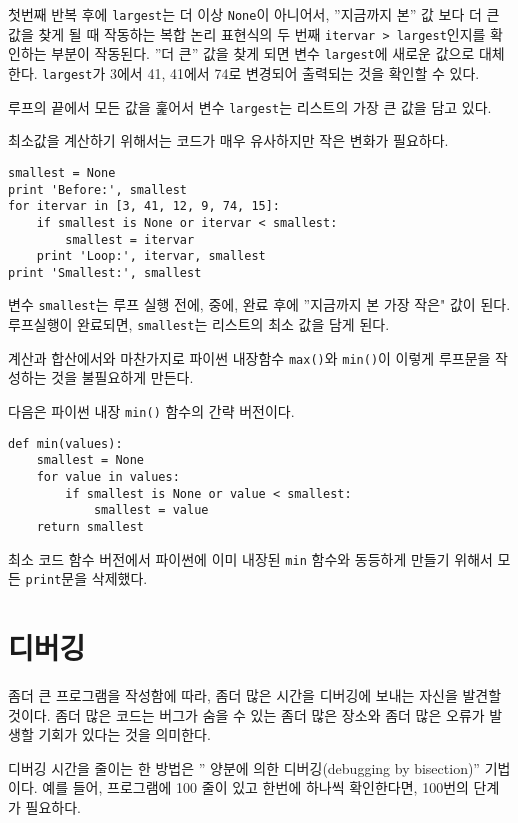 첫번째 반복 후에 {\tt largest}는 더 이상 {\tt None}이 아니어서, ''지금까지 본'' 값 보다 더 큰 값을 찾게 될 때 작동하는  복합 논리 표현식의 두 번째 {\tt itervar > largest}인지를 확인하는 부분이 작동된다. ''더 큰'' 값을 찾게 되면 변수 {\tt largest}에 새로운 값으로 대체한다.
{\tt largest}가 3에서 41, 41에서 74로 변경되어 출력되는 것을 확인할 수 있다.

루프의 끝에서 모든 값을 훑어서 변수 {\tt largest}는 리스트의 가장 큰 값을 담고 있다.

최소값을 계산하기 위해서는 코드가 매우 유사하지만 작은 변화가 필요하다.

\beforeverb
\begin{verbatim}
smallest = None
print 'Before:', smallest
for itervar in [3, 41, 12, 9, 74, 15]:
    if smallest is None or itervar < smallest:
        smallest = itervar
    print 'Loop:', itervar, smallest
print 'Smallest:', smallest
\end{verbatim}
\afterverb
%

변수 {\tt smallest}는 루프 실행 전에, 중에, 완료 후에 ''지금까지 본 가장 작은" 값이 된다.
루프실행이 완료되면, {\tt smallest}는 리스트의 최소 값을 담게 된다.

계산과 합산에서와 마찬가지로 파이썬 내장함수 {\tt max()}와 {\tt min()}이 이렇게 루프문을 작성하는 것을 불필요하게 만든다.

다음은 파이썬 내장 {\tt min()} 함수의 간략 버전이다.

\beforeverb
\begin{verbatim}
def min(values):
    smallest = None
    for value in values:
        if smallest is None or value < smallest:
            smallest = value
    return smallest
\end{verbatim}
\afterverb
%

최소 코드 함수 버전에서 파이썬에 이미 내장된 {\tt min} 함수와 동등하게 만들기 위해서 모든 {\tt print}문을 삭제했다.

\section{디버깅}

좀더 큰 프로그램을 작성함에 따라, 좀더 많은 시간을 디버깅에 보내는 자신을 발견할 것이다.
좀더 많은 코드는 버그가 숨을 수 있는 좀더 많은 장소와 좀더 많은 오류가 발생할 기회가 있다는 것을 의미한다.


디버깅 시간을 줄이는 한 방법은 '' 양분에 의한 디버깅(debugging by bisection)'' 기법이다.
예를 들어, 프로그램에 100 줄이 있고 한번에 하나씩 확인한다면, 100번의 단계가 필요하다.

